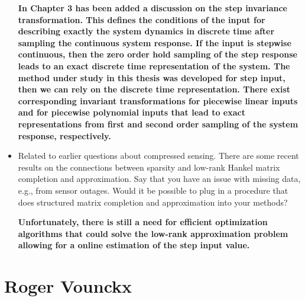 \documentclass[11pt]{article}
\begin{document}
\begin{itemize}
	{\bfseries In Chapter 3 has been added a discussion on the step invariance transformation. This defines the conditions of the input for describing exactly the system dynamics in discrete time after sampling the continuous system response. If the input is stepwise continuous, then the zero order hold sampling of the step response leads to an exact discrete time representation of the system. The method under study in this thesis was developed for step input, then we can rely on the discrete time representation. There exist corresponding invariant transformations for piecewise linear inputs and for piecewise polynomial inputs that lead to exact representations from first and second order sampling of the system response, respectively.  }
	
	\item  Related to earlier questions about compressed sensing. There are some recent results on the connections between sparsity and low-rank Hankel matrix completion and approximation. Say that you have an issue with missing data, e.g., from sensor outages. Would it be possible to plug in a procedure that does structured matrix completion and approximation into your methods?
	
    {\bfseries Unfortunately, there is still a need for efficient optimization algorithms that could solve the low-rank approximation problem allowing for a online estimation of the step input value. }

\end{itemize}

\section*{Roger Vounckx}
\end{document}

